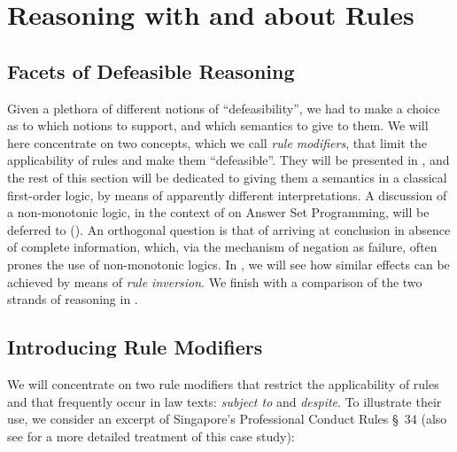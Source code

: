 \section{Reasoning with and about Rules}\label{sec:resasoning_with_rules}


\subsection{Facets of Defeasible Reasoning}\label{sec:facets}

Given a plethora of different notions of ``defeasibility'', we had to make a
choice as to which notions to support, and which semantics to give to them. We
will here concentrate on two concepts, which we call \emph{rule modifiers},
that limit the applicability of rules and make them ``defeasible''. They will
be presented in , and the rest of this section will be dedicated to giving
them a semantics in a classical first-order logic, by means of apparently different interpretations.
A discussion of a non-monotonic
logic, in the context of on Answer Set Programming, will be deferred to
(). An orthogonal question is that of
arriving at conclusion in absence of complete information, which, via the
mechanism of negation as  failure, often prones the use of
non-monotonic logics. In , we will see how similar
effects can be achieved by means of \emph{rule inversion}.  We finish
with a comparison of the two strands of reasoning in .


\subsection{Introducing Rule Modifiers}\label{sec:intro_rule_modifiers}

We will concentrate on two rule modifiers that restrict the applicability of
rules and that frequently occur in law texts: \emph{subject to} and
\emph{despite}. To illustrate their use, we consider an excerpt of Singapore's
Professional Conduct Rules \S~34 \cite{professional_conduct_rules} (also see
\cite{morris21:_const_answer_set_progr_tool} for a more detailed treatment of
this case study):

